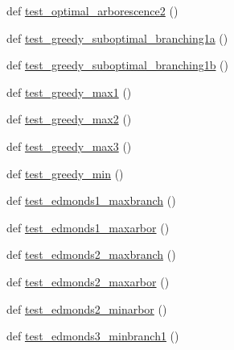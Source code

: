 \begin{DoxyCompactItemize}
\item 
def \hyperlink{namespacenetworkx_1_1algorithms_1_1tree_1_1tests_1_1test__branchings_a231295c563cf9ee009f8d9147ca0c150}{test\+\_\+optimal\+\_\+arborescence2} ()
\item 
def \hyperlink{namespacenetworkx_1_1algorithms_1_1tree_1_1tests_1_1test__branchings_a599fdf7eefeec31008334c16b041da9e}{test\+\_\+greedy\+\_\+suboptimal\+\_\+branching1a} ()
\item 
def \hyperlink{namespacenetworkx_1_1algorithms_1_1tree_1_1tests_1_1test__branchings_a9e29b107679f9b87e17458d2d18d8c47}{test\+\_\+greedy\+\_\+suboptimal\+\_\+branching1b} ()
\item 
def \hyperlink{namespacenetworkx_1_1algorithms_1_1tree_1_1tests_1_1test__branchings_a5b5b55187a1b4b7c356cc13aa558511f}{test\+\_\+greedy\+\_\+max1} ()
\item 
def \hyperlink{namespacenetworkx_1_1algorithms_1_1tree_1_1tests_1_1test__branchings_aee0ff7425ab1e4fd8e6c25c4c6870ab6}{test\+\_\+greedy\+\_\+max2} ()
\item 
def \hyperlink{namespacenetworkx_1_1algorithms_1_1tree_1_1tests_1_1test__branchings_a72732315a90d69d705e84b74f7e67c95}{test\+\_\+greedy\+\_\+max3} ()
\item 
def \hyperlink{namespacenetworkx_1_1algorithms_1_1tree_1_1tests_1_1test__branchings_ac09d6b5c8c82208fdac1ab57aefa1e67}{test\+\_\+greedy\+\_\+min} ()
\item 
def \hyperlink{namespacenetworkx_1_1algorithms_1_1tree_1_1tests_1_1test__branchings_a023be6a20a555fd1febd9cff50ada087}{test\+\_\+edmonds1\+\_\+maxbranch} ()
\item 
def \hyperlink{namespacenetworkx_1_1algorithms_1_1tree_1_1tests_1_1test__branchings_ac4180e55806cb501b7223b0b9a3785a1}{test\+\_\+edmonds1\+\_\+maxarbor} ()
\item 
def \hyperlink{namespacenetworkx_1_1algorithms_1_1tree_1_1tests_1_1test__branchings_afb960079e193113f25aeb872a92997c8}{test\+\_\+edmonds2\+\_\+maxbranch} ()
\item 
def \hyperlink{namespacenetworkx_1_1algorithms_1_1tree_1_1tests_1_1test__branchings_a88404d2ca2117b9b1c0d7010815ed74e}{test\+\_\+edmonds2\+\_\+maxarbor} ()
\item 
def \hyperlink{namespacenetworkx_1_1algorithms_1_1tree_1_1tests_1_1test__branchings_a0f8e6d056ab48e9d6df5c4732bbb08a5}{test\+\_\+edmonds2\+\_\+minarbor} ()
\item 
def \hyperlink{namespacenetworkx_1_1algorithms_1_1tree_1_1tests_1_1test__branchings_a8dae1f6b95c67d15946e3dbbd4208714}{test\+\_\+edmonds3\+\_\+minbranch1} ()

\end{DoxyCompactItemize}

